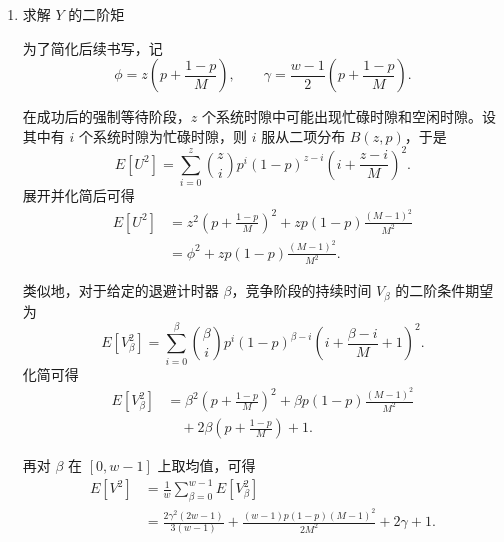 \begin{enumerate}[wide]
    \item 求解 $Y$ 的二阶矩

    为了简化后续书写，记
    \[
    \phi=z\left(p+\frac{1-p}{M}\right),\qquad
    \gamma=\frac{w-1}{2}\left(p+\frac{1-p}{M}\right).
    \]

    在成功后的强制等待阶段，$z$ 个系统时隙中可能出现忙碌时隙和空闲时隙。设其中有 $i$ 个系统时隙为忙碌时隙，则 $i$ 服从二项分布 $B(z,p)$，于是
    \begin{equation}
        E[U^2] = \sum_{i=0}^{z} \binom{z}{i} p^i (1-p)^{z-i} \left(i + \frac{z-i}{M}\right)^2.
    \end{equation}
    展开并化简后可得
    \begin{equation}
        \begin{aligned}
            E[U^2] &= z^2\left(p + \frac{1-p}{M}\right)^2 + zp(1-p)\frac{(M-1)^2}{M^2} \\
                   &= \phi^2 + zp(1-p)\frac{(M-1)^2}{M^2}.
        \end{aligned}
    \end{equation}

    类似地，对于给定的退避计时器 $\beta$，竞争阶段的持续时间 $V_\beta$ 的二阶条件期望为
    \begin{equation}
        E[V_\beta^2] = \sum_{i=0}^{\beta} \binom{\beta}{i} p^i (1-p)^{\beta-i} \left(i + \frac{\beta-i}{M} + 1\right)^2.
    \end{equation}
    化简可得
    \begin{equation}
        \begin{aligned}
            E[V_\beta^2] &= \beta^2\left(p + \frac{1-p}{M}\right)^2 + \beta p(1-p)\frac{(M-1)^2}{M^2} \\
                         &\quad + 2\beta\left(p + \frac{1-p}{M}\right) + 1.
        \end{aligned}
    \end{equation}

    再对 $\beta$ 在 $[0,w-1]$ 上取均值，可得
    \begin{equation}
        \begin{aligned}
            E[V^2] &= \frac{1}{w}\sum_{\beta=0}^{w-1} E[V_\beta^2] \\
                   &= \frac{2\gamma^2(2w-1)}{3(w-1)} + \frac{(w-1)p(1-p)(M-1)^2}{2M^2} + 2\gamma + 1.
        \end{aligned}
    \end{equation}


\end{enumerate}
